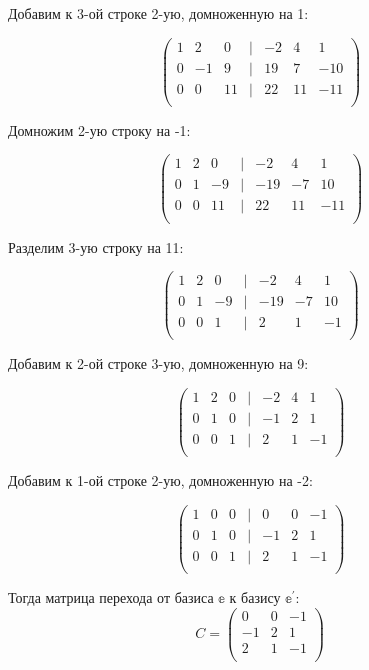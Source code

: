 	Добавим к 3-ой строке 2-ую, домноженную на 1:
	
	\[
	\begin{pmatrix}
	1 & 2 & 0 & | & -2 & 4 & 1 \\
	0 & -1 & 9 & | & 19 & 7 & -10 \\
	0 & 0 & 11 & | & 22 & 11 & -11 \\
	\end{pmatrix}
	\]
	
	Домножим 2-ую строку на -1:
	
	\[
	\begin{pmatrix}
	1 & 2 & 0 & | & -2 & 4 & 1 \\
	0 & 1 & -9 & | & -19 & -7 & 10 \\
	0 & 0 & 11 & | & 22 & 11 & -11 \\
	\end{pmatrix}
	\]
	
	Разделим 3-ую строку на 11:
	
	\[
	\begin{pmatrix}
	1 & 2 & 0 & | & -2 & 4 & 1 \\
	0 & 1 & -9 & | & -19 & -7 & 10 \\
	0 & 0 & 1 & | & 2 & 1 & -1 \\
	\end{pmatrix}
	\]
	
	Добавим к 2-ой строке 3-ую, домноженную на 9:
	
	\[
	\begin{pmatrix}
	1 & 2 & 0 & | & -2 & 4 & 1 \\
	0 & 1 & 0 & | & -1 & 2 & 1 \\
	0 & 0 & 1 & | & 2 & 1 & -1 \\
	\end{pmatrix}
	\]
	
	Добавим к 1-ой строке 2-ую, домноженную на -2:
	
	\[
	\begin{pmatrix}
	1 & 0 & 0 & | & 0 & 0 & -1 \\
	0 & 1 & 0 & | & -1 & 2 & 1 \\
	0 & 0 & 1 & | & 2 & 1 & -1 \\
	\end{pmatrix}
	\]
	
	Тогда матрица перехода от базиса $\mathbb{e}$ к базису $\mathbb{e}^\prime$: 
	\[ C =
	\begin{pmatrix}
	0 & 0 & -1 \\
	-1 & 2 & 1 \\
	2 & 1 & -1 \\
	\end{pmatrix}
	\]
	
